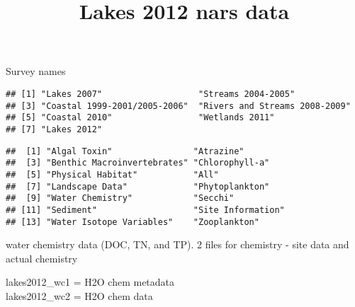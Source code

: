 \documentclass[]{article}
\title{Lakes 2012 nars data}
\author{}
\date{}
\newenvironment{Shaded}{\begin{snugshade}}{\end{snugshade}}
\newcommand{\KeywordTok}[1]{\textcolor[rgb]{0.13,0.29,0.53}{\textbf{#1}}}
\newcommand{\NormalTok}[1]{#1}
\newcommand{\OperatorTok}[1]{\textcolor[rgb]{0.81,0.36,0.00}{\textbf{#1}}}
\newcommand{\StringTok}[1]{\textcolor[rgb]{0.31,0.60,0.02}{#1}}
\begin{document}
\maketitle

Survey names

\begin{verbatim}
## [1] "Lakes 2007"                   "Streams 2004-2005"           
## [3] "Coastal 1999-2001/2005-2006"  "Rivers and Streams 2008-2009"
## [5] "Coastal 2010"                 "Wetlands 2011"               
## [7] "Lakes 2012"
\end{verbatim}

\begin{Shaded}
\end{Shaded}

\begin{verbatim}
##  [1] "Algal Toxin"                "Atrazine"                  
##  [3] "Benthic Macroinvertebrates" "Chlorophyll-a"             
##  [5] "Physical Habitat"           "All"                       
##  [7] "Landscape Data"             "Phytoplankton"             
##  [9] "Water Chemistry"            "Secchi"                    
## [11] "Sediment"                   "Site Information"          
## [13] "Water Isotope Variables"    "Zooplankton"
\end{verbatim}

water chemistry data (DOC, TN, and TP). 2 files for chemistry - site
data and actual chemistry

lakes2012\_wc1 = H2O chem metadata\\
lakes2012\_wc2 = H2O chem data
\end{document}
